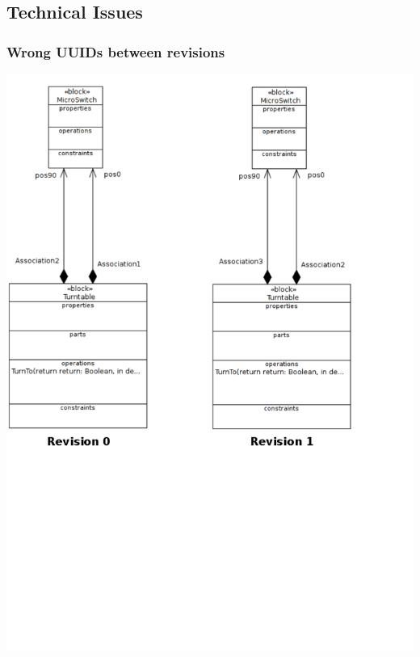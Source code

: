 \documentclass[10pt]{beamer}
\begin{document}
\subsection{Technical Issues}
\begin{frame}
\frametitle{Wrong UUIDs between revisions}
\begin{center}
\includegraphics[scale=0.33]{wrongUUIDs_examples_p1}\\
\end{center}
\end{frame}
\end{document}
